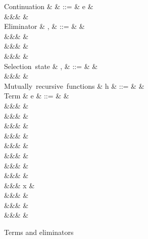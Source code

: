 \begin{figure}[H]
\begin{syntaxfig}
\mbox{Continuation}
&
\kappa
&
::=
&
e
&
\\
&&&
\sigma
&
\\[2mm]
\mbox{Eliminator}
&
\sigma, \tau
&
::=
&
&
\\
&&&
&
\\
&&&
&
\\
&&&
\elimList{\kappa}{\sigma}
&
\\[2mm]
\mbox{Selection state}
&
\alpha, \beta
&
::=
&
\TT
&
\\
&&&
\FF
&
\\[2mm]
\mbox{Mutually recursive functions}
&
h
&
::=
&
&
\\[2mm]
\mbox{Term}
&
e
&
::=
&
\hole
&
\\
&&&
\annTrue{\alpha} \mid \annFalse{\alpha}
&
\\
&&&
&
\\
&&&
&
\\
&&&
\annNil{\alpha}
&
\\
&&&
&
\\
&&&
&
\\
&&&
&
\\
&&&
&
\\
&&&
x
&
\\
&&&
\exLambda{\sigma}
&
\\
&&&
&
\\
&&&
&
\end{syntaxfig}
\caption{Terms and eliminators}
\end{figure}
